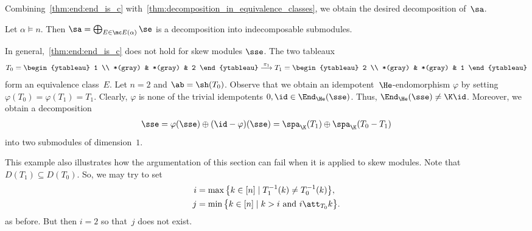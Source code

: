 
Combining~\cref{thm:end:end_is_c} with~\cref{thm:decomposition_in_equivalence_classes}, we obtain the desired decomposition of~$\sa$.

\begin{coro}
	Let $\alpha \vDash n$. Then $\sa = \bigoplus_{E\in \mc E(\alpha)} \se$ is a decomposition into indecomposable submodules.
\end{coro}

\begin{exam}
	\label{exa:decomposable_module}
	 In general,~\cref{thm:end:end_is_c} does not hold for skew modules $\sse$.
	The two tableaux
	\begin{align*}
	T_0 =
	\begin{ytableau}
	1 \\
	*(gray) & *(gray) & 2
	\end{ytableau}
	\overset{\pi_1}{\longrightarrow}
	T_1 = 
	\begin{ytableau}
	2 \\
	*(gray) & *(gray) & 1
	\end{ytableau}
	\end{align*}
	form an equivalence class~$E$. Let $n=2$ and $\ab=\sh(T_0)$. 
	Observe that we obtain an idempotent~$\He$-endomorphism $\varphi$ by setting $\varphi(T_0) = \varphi(T_1) = T_1$.
	 Clearly, $\varphi$ is none of the trivial idempotents $0,\id\in \End_{\He}(\sse)$. Thus, $\End_{\He}(\sse)\neq \K\id$. Moreover, we obtain a decomposition
	\begin{align*}
	\sse = \varphi(\sse) \oplus (\id -\varphi) (\sse) = \spa_\K(T_1) \oplus \spa_\K(T_0-T_1)
	\end{align*} 
	into two submodules of dimension~$1$.
	
	This example also illustrates how the argumentation of this section can fail when it is applied to skew modules. Note that $D(T_1) \subseteq D(T_0)$. So, we may try to set
	 \begin{align*}
		i &= \max \big\{ k \in [n] \mid T_1^{-1}(k) \neq T^{-1}_0(k) \big\}, \\
		j &= \min \big\{k \in [n] \mid k>i \text{ and } i\att_{T_0} k \big\}.
	\end{align*}
	as before.
	But then $i=2$ so that~$j$ does not exist. 
\end{exam}
